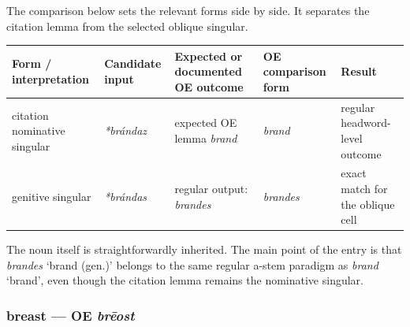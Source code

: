 \documentclass[
  british,
  a4paper,
]{article}
\newcounter{none} %
\begin{document}
The comparison below sets the relevant forms side by side. It separates
the citation lemma from the selected oblique singular.

{\def\LTcaptype{none} %
\begin{longtable}[]{@{}
  >{\raggedright\arraybackslash}p{}
  >{\raggedright\arraybackslash}p{}
  >{\raggedright\arraybackslash}p{}
  >{\raggedright\arraybackslash}p{}
  >{\raggedright\arraybackslash}p{}@{}}
\toprule\noalign{}
\begin{minipage}[b]{\linewidth}\raggedright
Form / interpretation
\end{minipage} & \begin{minipage}[b]{\linewidth}\raggedright
Candidate input
\end{minipage} & \begin{minipage}[b]{\linewidth}\raggedright
Expected or documented OE outcome
\end{minipage} & \begin{minipage}[b]{\linewidth}\raggedright
OE comparison form
\end{minipage} & \begin{minipage}[b]{\linewidth}\raggedright
Result
\end{minipage} \\
\midrule\noalign{}
\endhead
\bottomrule\noalign{}
\endlastfoot
citation nominative singular & {\emph{*brándaz}} & expected OE lemma
{\emph{brand}} & {\emph{brand}} & regular headword-level outcome \\
genitive singular & {\emph{*brándas}} & regular output: {\emph{brandes}}
& {\emph{brandes}} & exact match for the oblique cell \\
\end{longtable}
}

The noun itself is straightforwardly inherited. The main point of the
entry is that {\emph{brandes}} `brand (gen.)' belongs to the same
regular a-stem paradigm as {\emph{brand}} `brand', even though the
citation lemma remains the nominative singular.

\subsubsection{\texorpdfstring{breast --- OE
\emph{brēost}}{breast --- OE brēost}}\label{breast-oe-brux113ost}
\end{document}
